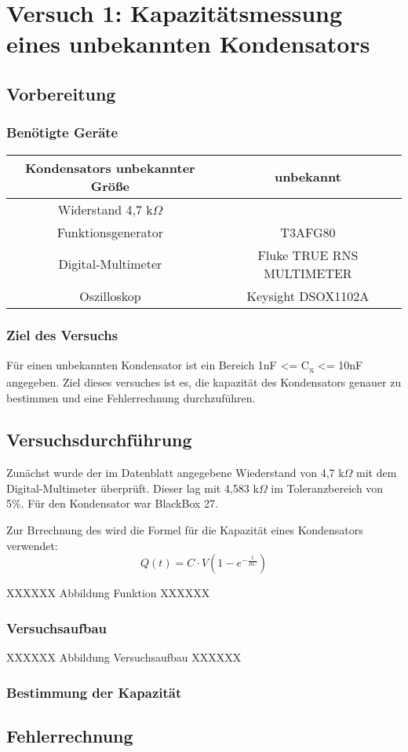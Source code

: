 \chapter{Versuch 1: Kapazitätsmessung eines unbekannten Kondensators}

\section{Vorbereitung}
\subsection{Benötigte Geräte}

\begin{tabular}[h]{c|c}
    Kondensators unbekannter Größe & unbekannt \\
    \hline
    Widerstand 4,7 k$\Omega$& \\
    \hline
    Funktionsgenerator & T3AFG80\\
    \hline
    Digital-Multimeter & Fluke TRUE RNS MULTIMETER\\
    \hline
    Oszilloskop & Keysight DSOX1102A
    \label{tab:Versuch 1: Geräte}
\end{tabular}

\subsection{Ziel des Versuchs}
Für einen unbekannten Kondensator ist ein Bereich 1nF <= C\textsubscript{x} <= 10nF 
angegeben. Ziel dieses versuches ist es, die kapazität des Kondensators genauer
zu bestimmen und eine Fehlerrechnung durchzuführen.

\section{Versuchsdurchführung}

Zunächst wurde der im Datenblatt angegebene Wiederstand von 4,7 k$\Omega$ 
mit dem Digital-Multimeter überprüft. Dieser lag mit 4,583 k$\Omega$ im 
Toleranzbereich von 5\%. Für den Kondensator war BlackBox 27.

Zur Brrechnung des wird die Formel für die Kapazität eines Kondensators verwendet:
\begin{equation}
    Q(t) = C \cdot V \left(1 - e^{-\frac{t}{RC}}\right)
\end{equation}

XXXXXX Abbildung Funktion XXXXXX

\subsection{Versuchsaufbau}

XXXXXX Abbildung Versuchsaufbau XXXXXX

\subsection{Bestimmung der Kapazität}

\section{Fehlerrechnung}



